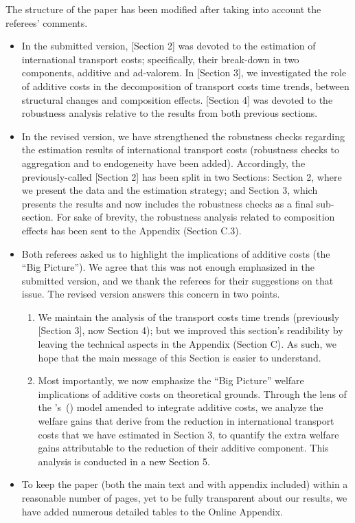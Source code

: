 \documentclass[a4paper,11pt]{article}
\newcommand\cites[1]{\citeauthor{#1}'s\ (\citeyear{#1})}
\begin{document}
The structure of the paper has been modified after taking into account the referees' comments.
\begin{itemize}
\item In the submitted version, [Section 2] was devoted to the estimation of international transport costs; specifically, their break-down in two components, additive and ad-valorem. In [Section 3], we investigated the role of additive costs in the decomposition of transport costs time trends, between structural changes and composition effects. [Section 4] was devoted to the robustness analysis relative to the results from both previous sections.
\item In the revised version, we have strengthened the robustness checks regarding the estimation results of international transport costs (robustness checks to aggregation and to endogeneity have been added). Accordingly, the previously-called [Section 2] has been split in two Sections: Section 2, where we present the data and the estimation strategy; and Section 3, which presents the results and now includes the robustness checks as a final sub-section. For sake of brevity, the robustness analysis related to composition effects has been sent to the Appendix (Section C.3).
\item Both referees asked us to highlight the implications of additive costs (the ``Big Picture''). We agree that this was not enough emphasized in the submitted version, and we thank the referees for their suggestions on that issue. The revised version answers this concern in two points.
    \begin{enumerate}
    \item We maintain the analysis of the transport costs time trends (previously [Section 3], now Section 4); but we improved this section’s readibility by leaving the technical aspects in the Appendix (Section C). As such, we hope that the main message of this Section is easier to understand.
    \item Most importantly, we now emphasize the ``Big Picture'' welfare implications of additive costs on theoretical grounds. Through the lens of the \cites{melitz} model amended to integrate additive costs, we analyze the welfare gains that derive from the reduction in international transport costs that we have estimated in Section 3, to quantify the extra welfare gains attributable to the reduction of their additive component. This analysis is conducted in a new Section 5.
        \end{enumerate}
\item To keep the paper (both the main text and with appendix included) within a reasonable number of pages, yet to be fully transparent about our results, we have added numerous detailed tables to the Online Appendix.
\end{itemize}
\end{document}
